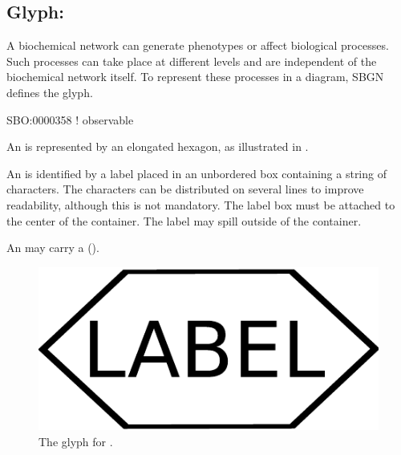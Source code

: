 
\subsection{Glyph: }
\label{sec:observable}

A biochemical network can generate phenotypes or affect biological
processes.  Such processes can take place at different levels and are
independent of the biochemical network itself.  To represent these
processes in a diagram, SBGN defines the  glyph.

\begin{glyphDescription}

\glyphSboTerm SBO:0000358 ! observable

\glyphContainer An  is represented by an elongated
hexagon, as illustrated in .

\glyphLabel An  is identified by a label placed in an
unbordered box containing a string of characters.  The characters can be
distributed on several lines to improve readability, although this is not
mandatory.  The label box must be attached to the center of the
 container.  The label may spill outside of the container.

\glyphAux An  may carry a 
().

\end{glyphDescription}
 
\begin{figure}[H]
  \centering
  \includegraphics[scale = 0.3]{images/observable}
  \caption{The \PD glyph for .}
  \label{fig:observable}
\end{figure}






